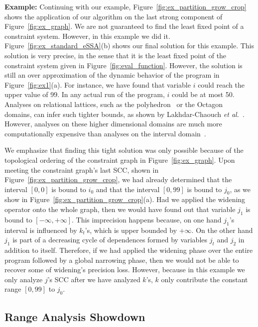 \documentclass[preprint]{elsarticle}
\begin{document}
\noindent
\textbf{Example:}
Continuing with our example, Figure~\ref{fig:ex_partition_grow_crop} shows
the application of our algorithm on the last strong component of
Figure~\ref{fig:ex_graph}.
We are not guaranteed to find the least fixed point of a constraint system.
However, in this example we did it.
Figure~\ref{fig:ex_standard_eSSA}(b) shows our final solution for this example.
This solution is very precise, in the sense that it is the least fixed
point of the constraint system given in Figure~\ref{fig:eval_function}.
However, the solution is still an over approximation of the dynamic behavior of
the program in Figure~\ref{fig:ex1}(a).
For instance, we have found that variable $i$ could reach the upper value of
99.
In any actual run of the program, $i$ could be at most 50.
Analyses on relational lattices, such as the polyhedron~\cite{Cousot78} or the
Octagon~\cite{Mine06} domains, can infer such tighter bounds, as shown by
Lakhdar-Chaouch {\em et al.}~\cite{Lakhdar11}.
However, analyses on these higher dimensional domains are much more
computationally expensive than analyses on the interval domain~\cite{Oh12}.

We emphasize that finding this tight solution was only possible because of
the topological ordering of the constraint graph in Figure~\ref{fig:ex_graph}.
Upon meeting the constraint graph's last SCC, shown in
Figure~\ref{fig:ex_partition_grow_crop}, we had already determined that the
interval $[0, 0]$ is bound to $i_0$ and that the interval $[0, 99]$ is bound to
$j_0$, as we show in Figure~\ref{fig:ex_partition_grow_crop}(a).
Had we applied the widening operator onto the whole graph, then we would
have found out that variable $j_1$ is bound to $[-\infty, +\infty]$.
This imprecision happens because, on one hand $j_1$'s interval is influenced
by $k_t$'s, which is upper bounded by $+\infty$.
On the other hand $j_1$ is part of a decreasing cycle of dependences formed by
variables $j_t$ and $j_2$ in addition to itself.
Therefore, if we had applied the widening phase over the entire program followed
by a global narrowing phase, then we would not be able to recover some of
widening's precision loss.
However, because in this example we only analyze $j$'s SCC after we have
analyzed $k$'s, $k$ only contribute the constant range $[0, 99]$ to $j_0$.


\subsection{Range Analysis Showdown}
\label{sub:showdown}
\end{document}
